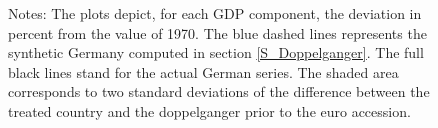 \documentclass[12pt]{article}
\newcommand{\annote}[1]{\parbox{\textwidth}{\renewcommand{\baselinestretch}{1.0}\vspace{12pt} \small Notes: #1}}
\begin{document}
\begin{appendices}
\begin{figure}[h!]
    \annote{The plots depict, for each GDP component, the deviation in percent from the value of 1970. The blue dashed lines represents the synthetic Germany computed in section \ref{S_Doppelganger}. The full black lines stand for the actual German series. The shaded area corresponds to two standard deviations of the difference between the treated country and the doppelganger prior to the euro accession. }
\end{figure}


\end{appendices}
\end{document}
